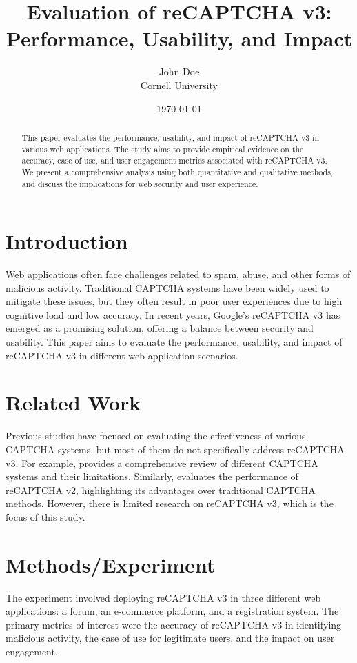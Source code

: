 \documentclass{article}
\title{Evaluation of reCAPTCHA v3: Performance, Usability, and Impact}
\author{John Doe \\
    Cornell University}
\date{\today}
\begin{document}
\maketitle

\begin{abstract}
This paper evaluates the performance, usability, and impact of reCAPTCHA v3 in various web applications. The study aims to provide empirical evidence on the accuracy, ease of use, and user engagement metrics associated with reCAPTCHA v3. We present a comprehensive analysis using both quantitative and qualitative methods, and discuss the implications for web security and user experience.
\end{abstract}

\section{Introduction}
\label{sec:introduction}

Web applications often face challenges related to spam, abuse, and other forms of malicious activity. Traditional CAPTCHA systems have been widely used to mitigate these issues, but they often result in poor user experiences due to high cognitive load and low accuracy. In recent years, Google's reCAPTCHA v3 has emerged as a promising solution, offering a balance between security and usability. This paper aims to evaluate the performance, usability, and impact of reCAPTCHA v3 in different web application scenarios.

\section{Related Work}
\label{sec:related_work}

Previous studies have focused on evaluating the effectiveness of various CAPTCHA systems, but most of them do not specifically address reCAPTCHA v3. For example, \cite{capthca_review} provides a comprehensive review of different CAPTCHA systems and their limitations. Similarly, \cite{reCaptcha_v2} evaluates the performance of reCAPTCHA v2, highlighting its advantages over traditional CAPTCHA methods. However, there is limited research on reCAPTCHA v3, which is the focus of this study.

\section{Methods/Experiment}
\label{sec:methods}

The experiment involved deploying reCAPTCHA v3 in three different web applications: a forum, an e-commerce platform, and a registration system. The primary metrics of interest were the accuracy of reCAPTCHA v3 in identifying malicious activity, the ease of use for legitimate users, and the impact on user engagement.
\end{document}
